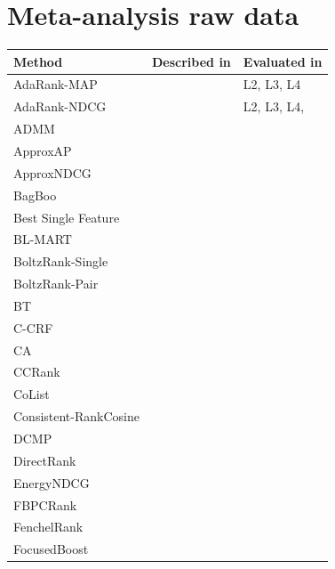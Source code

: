 \documentclass[english, authoryear, preprint]{elsarticle}
\begin{document}



\appendix
\section{Meta-analysis raw data}

\begin{table}[!hpt]
\tiny{
\begin{tabular}{lll}\toprule
Method & Described in & Evaluated in\\
\midrule
AdaRank-MAP & \cite{Xu2007} & L2, L3, L4 \\
AdaRank-NDCG & \cite{Xu2007} & L2, L3, L4,  \cite{Busa-Fekete2013,Tan2013} \\ 
ADMM & \cite{Duh2011} & \cite{Duh2011} \\ 
ApproxAP & \cite{Qin2010b} & \cite{Qin2010b} \\ 
ApproxNDCG & \cite{Qin2010b} & \cite{Qin2010b} \\ 
BagBoo & \cite{Pavlov2010} & \cite{Ganjisaffar2011c} \\ 
Best Single Feature &  & \cite{Gomes2013} \\ 
BL-MART & \cite{Ganjisaffar2011c} & \cite{Ganjisaffar2011c} \\ 
BoltzRank-Single & \cite{Volkovs2009} & \cite{Volkovs2009, Volkovs2013} \\ 
BoltzRank-Pair & \cite{Volkovs2009} & \cite{Volkovs2009, Ganjisaffar2011c, Volkovs2013} \\ 
BT & \cite{Zhou2008} & \cite{Zhou2008} \\ 
C-CRF & \cite{Qin2008b} & \cite{Qin2008b} \\ 
CA & \cite{Metzler2007} & \cite{Busa-Fekete2013,Tan2013} \\ 
CCRank & \cite{Wang2011c} & \cite{Wang2011c} \\ 
CoList & \cite{Gao2014} & \cite{Gao2014} \\
Consistent-RankCosine & \cite{Ravikumar2011} & \cite{Tan2013} \\
DCMP & \cite{Renjifo2012}  & \cite{Renjifo2012}  \\
DirectRank & \cite{Tan2013} & \cite{Tan2013} \\
EnergyNDCG & \cite{Freno2011} & \cite{Freno2011} \\
FBPCRank & \cite{Lai2011} & \cite{Lai2011} \\
FenchelRank & \cite{Lai2013} & \cite{Lai2013, Lai2013b, Laporte2013} \\ 
FocusedBoost & \cite{Niu2012} & \cite{Niu2012} \\ 

\end{tabular}}
\end{table}
\end{document}
